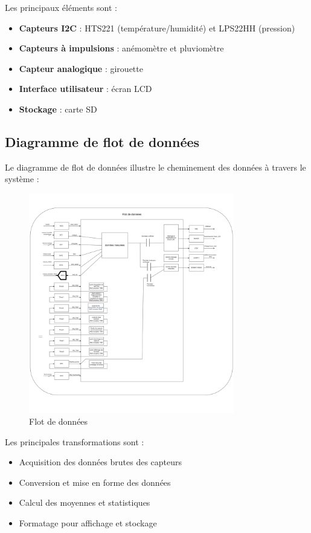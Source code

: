 \documentclass[12pt]{article}
\begin{document}
Les principaux éléments sont :
\begin{itemize}
    \item \textbf{Capteurs I2C} : HTS221 (température/humidité) et LPS22HH (pression)
    \item \textbf{Capteurs à impulsions} : anémomètre et pluviomètre
    \item \textbf{Capteur analogique} : girouette
    \item \textbf{Interface utilisateur} : écran LCD
    \item \textbf{Stockage} : carte SD
\end{itemize}

\subsection{Diagramme de flot de données}
Le diagramme de flot de données illustre le cheminement des données à travers le système :

\begin{figure}[H]
    \capstart
    \centering
    \includegraphics[width=0.8\textwidth]{./images/flot_de_donnees1.png}
    \caption{Flot de données}
    \label{fig:flot_de_donnees}
\end{figure}

Les principales transformations sont :
\begin{itemize}
    \item Acquisition des données brutes des capteurs
    \item Conversion et mise en forme des données
    \item Calcul des moyennes et statistiques
    \item Formatage pour affichage et stockage
\end{itemize}
\end{document}

